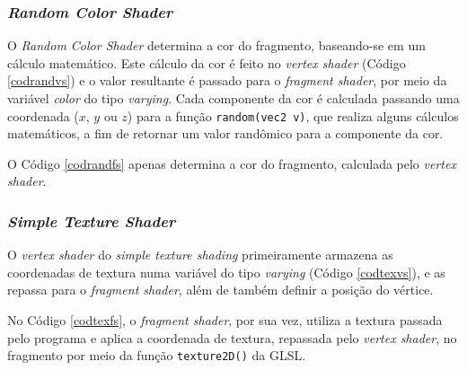 	

\subsubsection{\textit{Random Color Shader}}

	O \textit{Random Color Shader} determina a cor do fragmento, baseando-se em um cálculo matemático. Este cálculo da cor é feito no \textit{vertex shader} (Código \ref{codrandvs}) e o valor resultante é passado para o \textit{fragment shader}, por meio da variável \textit{color} do tipo \textit{varying}. Cada componente da cor é calculada passando uma coordenada ($x$, $y$ ou $z$) para a função \texttt{random(vec2 v)}, que realiza alguns cálculos matemáticos, a fim de retornar um valor randômico para a componente da cor.

	

	O Código \ref{codrandfs} apenas determina a cor do fragmento, calculada pelo \textit{vertex shader}.
 
	

\subsubsection{\textit{Simple Texture Shader}}

	O \textit{vertex shader} do \textit{simple texture shading} primeiramente armazena as coordenadas de textura numa variável do tipo \textit{varying} (Código \ref{codtexvs}), e as repassa para o \textit{fragment shader}, além de também definir a posição do vértice.  

	

	No Código \ref{codtexfs}, o \textit{fragment shader}, por sua vez, utiliza a textura passada pelo programa e aplica a coordenada de textura, repassada pelo \textit{vertex shader}, no fragmento por meio da função \texttt{texture2D()} da GLSL.

	

